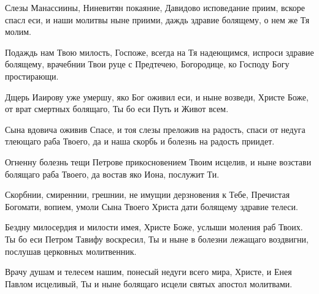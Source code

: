\begin{mymulticols}
\slava

Слезы Манассиины, Ниневитян покаяние, Давидово исповедание приим, вскоре спасл еси, и наши молитвы ныне приими, даждь здравие болящему, о нем же Тя молим.

\inyne

Подаждь нам Твою милость, Госпоже, всегда на Тя надеющимся, испроси здравие болящему, врачебнии Твои руце с Предтечею, Богородице, ко Господу Богу простирающи.






\normalfont{}Дщерь Иаирову уже умершу, яко Бог оживил еси, и ныне возведи, Христе Боже, от врат смертных болящаго, Ты бо еси Путь и Живот всем.


\normalfont{}Сына вдовича оживив Спасе, и тоя слезы преложив на радость, спаси от недуга тлеющаго раба Твоего, да и наша скорбь и болезнь на радость приидет.

\slava

Огненну болезнь тещи Петрове прикосновением Твоим исцелив, и ныне возстави болящаго раба Твоего, да востав яко Иона, послужит Ти.

\inyne

Скорбнии, смиреннии, грешнии, не имущии дерзновения к Тебе, Пречистая Богомати, вопием, умоли Сына Твоего Христа дати болящему здравие телеси.






\normalfont{}Бездну милосердия и милости имея, Христе Боже, услыши моления раб Твоих. Ты бо еси Петром Тавифу воскресил, Ты и ныне в болезни лежащаго воздвигни, послушав церковных молитвенник.


\normalfont{}Врачу душам и телесем нашим, понесый недуги всего мира, Христе, и Енея Павлом исцеливый, Ты и ныне болящаго исцели святых апостол молитвами.


\end{mymulticols}
